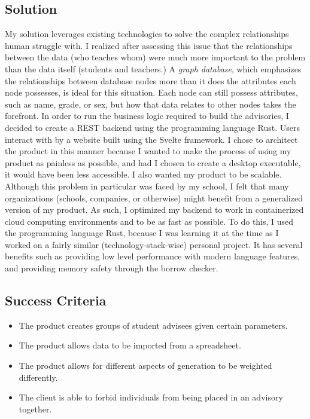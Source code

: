 \documentclass{paper}
\begin{document}
\subsection{Solution}
My solution leverages existing technologies to solve the complex relationships human struggle with.
I realized after assessing this issue that the relationships between the data (who teaches whom) were much more important to the problem than the data itself (students and teachers.)
A \textit{graph database}, which emphasizes the relationships between database nodes more than it does the attributes each node possesses, is ideal for this situation.
Each node can still possess attributes, such as name, grade, or sex, but how that data relates to other nodes takes the forefront.
In order to run the business logic required to build the advisories, I decided to create a REST backend using the programming language Rust.
Users interact with by a website built using the Svelte framework.
I chose to architect the product in this manner because I wanted to make the process of using my product as painless as possible, and had I chosen to create a desktop executable, it would have been less accessible.
I also wanted my product to be scalable.
Although this problem in particular was faced by my school, I felt that many organizations (schools, companies, or otherwise) might benefit from a generalized version of my product.
As such, I optimized my backend to work in containerized cloud computing environments and to be as fast as possible.
To do this, I used the programming language Rust, because I was learning it at the time as I worked on a fairly similar (technology-stack-wise) personal project.
It has several benefits such as providing low level performance with modern language features, and providing memory safety through the borrow checker.

\subsection{Success Criteria}
\begin{itemize}
  \item The product creates groups of student advisees given certain parameters.
  \item The product allows data to be imported from a spreadsheet.
  \item The product allows for different aspects of generation to be weighted differently.
  \item The client is able to forbid individuals from being placed in an advisory together.
\end{itemize}
\end{document}
